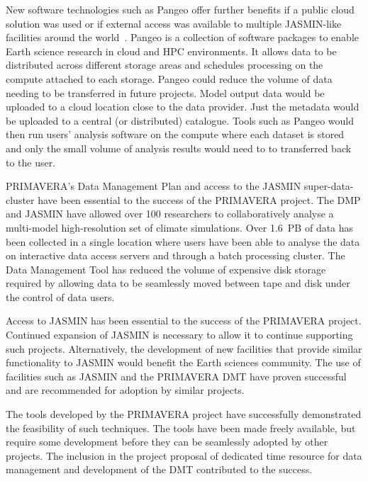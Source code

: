 \documentclass[gmd, manuscript]{copernicus}
\begin{document}
New software technologies such as Pangeo offer further benefits if a public cloud solution was used or if external access was available to multiple JASMIN-like facilities around the world~\citep{Pangeo}. Pangeo is a collection of software packages to enable Earth science research in cloud and HPC environments. It allows data to be distributed across different storage areas and schedules processing on the compute attached to each storage. Pangeo could reduce the volume of data needing to be transferred in future projects. Model output data would be uploaded to a cloud location close to the data provider. Just the metadata would be uploaded to a central (or distributed) catalogue. Tools such as Pangeo would then run users' analysis software on the compute where each dataset is stored and only the small volume of analysis results would need to to transferred back to the user.

\conclusions  %

PRIMAVERA's Data Management Plan and access to the JASMIN super-data-cluster have been essential to the success of the PRIMAVERA project. The DMP and JASMIN have allowed over 100 researchers to collaboratively analyse a multi-model high-resolution set of climate simulations. Over 1.6~PB of data has been collected in a single location where users have been able to analyse the data on interactive data access servers and through a batch processing cluster. The Data Management Tool has reduced the volume of expensive disk storage required by allowing data to be seamlessly moved between tape and disk under the control of data users.

Access to JASMIN has been essential to the success of the PRIMAVERA project. Continued expansion of JASMIN is necessary to allow it to continue supporting such projects. Alternatively, the development of new facilities that provide similar functionality to JASMIN would benefit the Earth sciences community. The use of facilities such as JASMIN and the PRIMAVERA DMT have proven successful and are recommended for adoption by similar projects.

The tools developed by the PRIMAVERA project have successfully demonstrated the feasibility of such techniques. The tools have been made freely available, but require some development before they can be seamlessly adopted by other projects. The inclusion in the project proposal of dedicated time resource for data management and development of the DMT contributed to the success.
\end{document}
